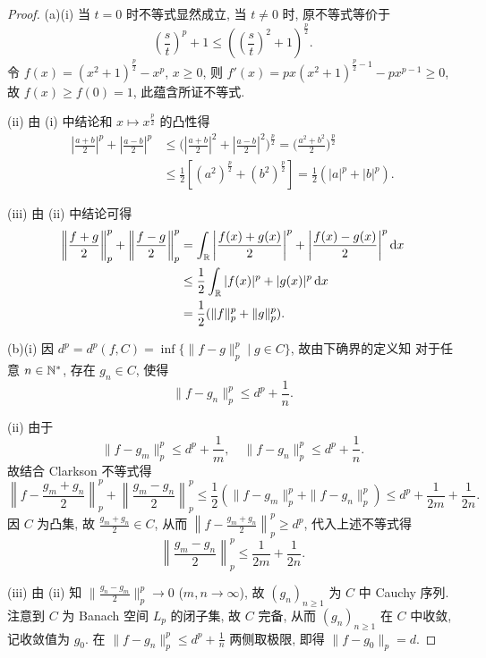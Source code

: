 \begin{proof}
     (a)(i) 当 $t=0$ 时不等式显然成立, 当 $t\neq 0$ 时, 原不等式等价于
     \[\left(\frac{s}{t}\right)^p+1\leq\left(\left(\frac{s}{t}\right)^2+1\right)^{\frac{p}{2}}.\]
     令 $f(x)=(x^2+1)^{\frac{p}{2}}-x^p$, $x\geq 0$, 则
     $f'(x)=px(x^2+1)^{\frac{p}{2}-1}-px^{p-1}\geq 0$,
     故 $f(x)\geq f(0)=1$, 此蕴含所证不等式.

     (ii) 由 (i) 中结论和 $x\mapsto x^{\frac{p}{2}}$ 的凸性得
     \begin{align*}
         \left|\frac{a+b}{2}\right|^p+\left|\frac{a-b}{2}\right|^p
         & \leq\biggl(\left|\frac{a+b}{2}\right|^2+\left|\frac{a-b}{2}\right|^2\biggr)^{\frac{p}{2}}  =\biggl(\frac{a^2+b^2}{2}\biggr)^{\frac{p}{2}} \\
         & \leq\frac{1}{2}\left[(a^2)^{\frac{p}{2}}+(b^2)^{\frac{p}{2}}\right] =\frac{1}{2}(|a|^p+|b|^p).
     \end{align*}

     (iii) 由 (ii) 中结论可得
     \begin{align*}
        \left\|\frac{f+g}{2}\right\|_{p}^{p}+\left\|\frac{f-g}{2}\right\|_{p}^{p}
        & =\int_{\mathbb{R}}\left|\frac{f(x)+g(x)}{2}\right|^p+\left|\frac{f(x)-g(x)}{2}\right|^p\mathop{}\!\mathrm{d} x \\
        & \leq\frac{1}{2}\int_{\mathbb{R}} |f(x)|^p+|g(x)|^p \mathop{}\!\mathrm{d} x \\
        & =\frac{1}{2}(\|f\|_p^p+\|g\|_p^p).
     \end{align*} 

     (b)(i) 因 $d^p=d^p(f,C)=\inf\{\|f-g\|_p^p\mid g\in C\}$, 故由下确界的定义知
     对于任意 $n\in\mathbb{N}^*$, 存在 $g_n\in C$, 使得
     \[\|f-g_n\|_p^p\leq d^p+\frac{1}{n}.\]

     (ii) 由于
     \[\|f-g_m\|_p^p\leq d^p+\frac{1}{m},\quad \|f-g_n\|_p^p\leq d^p+\frac{1}{n}.\]
     故结合 Clarkson 不等式得
     \[\left\| f-\frac{g_m+g_n}{2}\right\|_p^p+\left\|\frac{g_m-g_n}{2}\right\|_p^p\leq\frac{1}{2}\left(\|f-g_m\|_p^p+\|f-g_n\|_p^p\right)\leq d^p+\frac{1}{2m}+\frac{1}{2n}.\]
     因 $C$ 为凸集, 故 $\frac{g_m+g_n}{2}\in C$, 从而 $\left\|f-\frac{g_m+g_n}{2}\right\|_p^p\geq d^p$,
     代入上述不等式得
     \[\left\|\frac{g_m-g_n}{2}\right\|_p^p\leq\frac{1}{2m}+\frac{1}{2n}.\]

     (iii) 由 (ii) 知 $\|\frac{g_n-g_m}{2}\|_p^p\to 0$ ($m,n\to\infty$),
     故 $(g_n)_{n\geq 1}$ 为 $C$ 中 Cauchy 序列. 注意到 $C$ 为 Banach 空间 $L_p$
     的闭子集, 故 $C$ 完备, 从而 $(g_n)_{n\geq 1}$ 在 $C$ 中收敛, 记收敛值为 $g_0$.
     在 $\|f-g_n\|_p^p\leq d^p+\frac{1}{n}$ 两侧取极限, 即得 $\|f-g_0\|_p=d$.


\end{proof}
